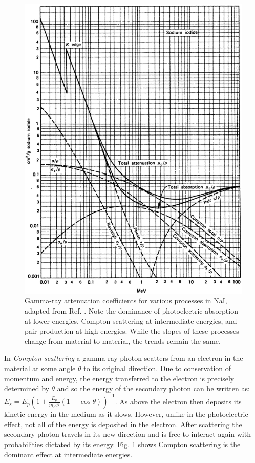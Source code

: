 \begin{figure}[hb!]
	\centerline{\includegraphics[height=0.7\textheight]{./img/c3/gamma_interactions_scan.eps}}
	\caption{Gamma-ray attenuation coefficients for various processes in NaI, adapted from Ref. \cite{knollBook}. Note the dominance of photoelectric absorption at lower energies, Compton scattering at intermediate energies, and pair production at high energies. While the slopes of these processes change from material to material, the trends remain the same.}
	\label{fig:chp3-gamma-interactions}
\end{figure}

In \emph{Compton scattering} a gamma-ray photon scatters from an electron in the material at some angle $\theta$ to its original direction\cite{Compton-PhysRev.21.483}. Due to conservation of momentum and energy, the energy transferred to the electron is precisely determined by $\theta$ and so the energy of the secondary photon can be written as: $E_{s}=E_{p}(1+\frac{E_{p}}{m_{e}c^2}(1-\cos\theta))^{-1}$. As above the electron then deposits its kinetic energy in the medium as it slows. However, unlike in the photoelectric effect, not all of the energy is deposited in the electron. After scattering the secondary photon travels in its new direction and is free to interact again with probabilities dictated by its energy. Fig. \ref{fig:chp3-gamma-interactions} shows Compton scattering is the dominant effect at intermediate energies.

